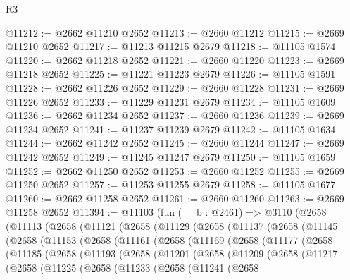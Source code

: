 \begin{lexlean}{R3}
\begin{coremodule}
@11212 := @2662 @11210 @2652
@11213 := @2660 @11212
@11215 := @2669 @11210 @2652
@11217 := @11213 @11215 @2679
@11218 := @11105 @1574
@11220 := @2662 @11218 @2652
@11221 := @2660 @11220
@11223 := @2669 @11218 @2652
@11225 := @11221 @11223 @2679
@11226 := @11105 @1591
@11228 := @2662 @11226 @2652
@11229 := @2660 @11228
@11231 := @2669 @11226 @2652
@11233 := @11229 @11231 @2679
@11234 := @11105 @1609
@11236 := @2662 @11234 @2652
@11237 := @2660 @11236
@11239 := @2669 @11234 @2652
@11241 := @11237 @11239 @2679
@11242 := @11105 @1634
@11244 := @2662 @11242 @2652
@11245 := @2660 @11244
@11247 := @2669 @11242 @2652
@11249 := @11245 @11247 @2679
@11250 := @11105 @1659
@11252 := @2662 @11250 @2652
@11253 := @2660 @11252
@11255 := @2669 @11250 @2652
@11257 := @11253 @11255 @2679
@11258 := @11105 @1677
@11260 := @2662 @11258 @2652
@11261 := @2660 @11260
@11263 := @2669 @11258 @2652
@11394 := @11103
    (fun (__b : @2461) =>
    @3110
      (@2658
        (@11113
          (@2658
            (@11121
              (@2658
                (@11129
                  (@2658
                    (@11137
                      (@2658
                        (@11145
                          (@2658
                            (@11153
                              (@2658
                                (@11161
                                  (@2658
                                    (@11169
                                      (@2658
                                        (@11177
                                          (@2658
                                            (@11185
                                              (@2658
                                                (@11193
                                                  (@2658
                                                    (@11201
                                                      (@2658
                                                        (@11209
                                                          (@2658
                                                            (@11217
                                                              (@2658
                                                                (@11225
                                                                  (@2658
                                                                    (@11233
                                                                      (@2658
                                                                        (@11241
                                                                          (@2658

\end{coremodule}
\end{lexlean}
